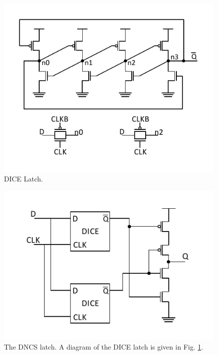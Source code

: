 \begin{figure}[!htbp]
	\centering
	\includegraphics[trim = 0mm 6mm 0mm 6mm, clip, width=0.8\linewidth]{Figures/DICE}
	\caption{DICE Latch.}
	\label{DICE_fig}
\end{figure}

\begin{figure}[!htbp]
	\centering
	\includegraphics[trim = 0mm 6mm 0mm 7mm, clip, width=0.8\linewidth]{Figures/DNCS}
	\caption{The DNCS latch. A diagram of the DICE latch is given in Fig. \ref{DICE_fig}.}
	\label{DNCS_fig}
\end{figure}

